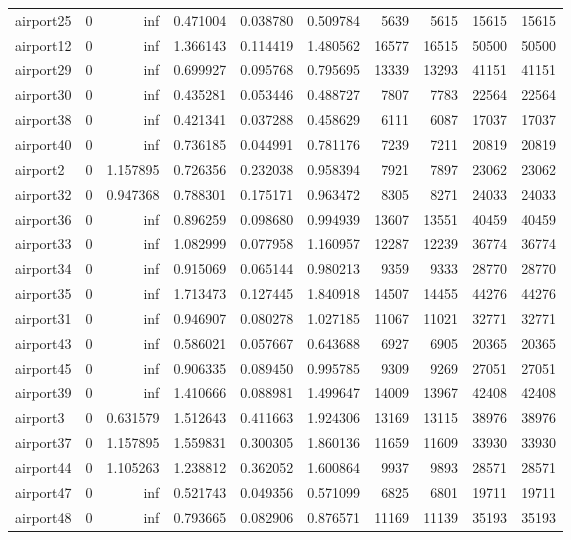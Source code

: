 \begin{longtable}{|l|r|r|r|r|r|r|r|r|r|}
airport25 & 0 & inf & 0.471004 & 0.038780 & 0.509784 & 5639 & 5615 & 15615 & 15615 \\
airport12 & 0 & inf & 1.366143 & 0.114419 & 1.480562 & 16577 & 16515 & 50500 & 50500 \\
airport29 & 0 & inf & 0.699927 & 0.095768 & 0.795695 & 13339 & 13293 & 41151 & 41151 \\
airport30 & 0 & inf & 0.435281 & 0.053446 & 0.488727 & 7807 & 7783 & 22564 & 22564 \\
airport38 & 0 & inf & 0.421341 & 0.037288 & 0.458629 & 6111 & 6087 & 17037 & 17037 \\
airport40 & 0 & inf & 0.736185 & 0.044991 & 0.781176 & 7239 & 7211 & 20819 & 20819 \\
airport2 & 0 & 1.157895 & 0.726356 & 0.232038 & 0.958394 & 7921 & 7897 & 23062 & 23062 \\
airport32 & 0 & 0.947368 & 0.788301 & 0.175171 & 0.963472 & 8305 & 8271 & 24033 & 24033 \\
airport36 & 0 & inf & 0.896259 & 0.098680 & 0.994939 & 13607 & 13551 & 40459 & 40459 \\
airport33 & 0 & inf & 1.082999 & 0.077958 & 1.160957 & 12287 & 12239 & 36774 & 36774 \\
airport34 & 0 & inf & 0.915069 & 0.065144 & 0.980213 & 9359 & 9333 & 28770 & 28770 \\
airport35 & 0 & inf & 1.713473 & 0.127445 & 1.840918 & 14507 & 14455 & 44276 & 44276 \\
airport31 & 0 & inf & 0.946907 & 0.080278 & 1.027185 & 11067 & 11021 & 32771 & 32771 \\
airport43 & 0 & inf & 0.586021 & 0.057667 & 0.643688 & 6927 & 6905 & 20365 & 20365 \\
airport45 & 0 & inf & 0.906335 & 0.089450 & 0.995785 & 9309 & 9269 & 27051 & 27051 \\
airport39 & 0 & inf & 1.410666 & 0.088981 & 1.499647 & 14009 & 13967 & 42408 & 42408 \\
airport3 & 0 & 0.631579 & 1.512643 & 0.411663 & 1.924306 & 13169 & 13115 & 38976 & 38976 \\
airport37 & 0 & 1.157895 & 1.559831 & 0.300305 & 1.860136 & 11659 & 11609 & 33930 & 33930 \\
airport44 & 0 & 1.105263 & 1.238812 & 0.362052 & 1.600864 & 9937 & 9893 & 28571 & 28571 \\
airport47 & 0 & inf & 0.521743 & 0.049356 & 0.571099 & 6825 & 6801 & 19711 & 19711 \\
airport48 & 0 & inf & 0.793665 & 0.082906 & 0.876571 & 11169 & 11139 & 35193 & 35193 \\

\end{longtable}
